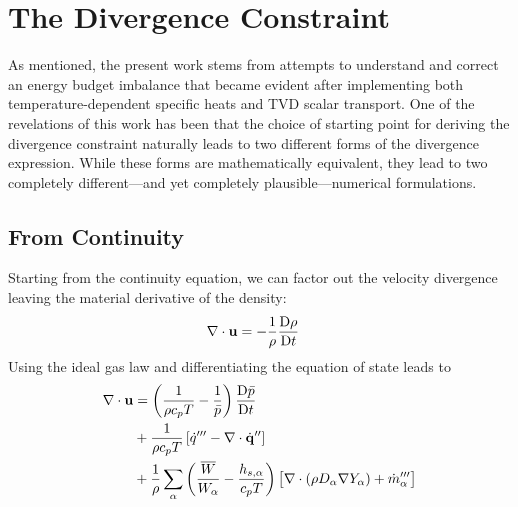 \section{The Divergence Constraint}
\label{div_constraint}

As mentioned, the present work stems from attempts to understand and correct an energy budget imbalance that became evident after implementing both temperature-dependent specific heats and TVD scalar transport. One of the revelations of this work has been that the choice of starting point for deriving the divergence constraint naturally leads to two different forms of the divergence expression.  While these forms are mathematically equivalent, they lead to two completely different---and yet completely plausible---numerical formulations.

\subsection{From Continuity}
Starting from the continuity equation, we can factor out the velocity divergence leaving the material derivative of the density:
\begin{align}
\nabla\cdot\mathbf{u} &= -\frac{1}{\rho}\frac{\mbox{D}\rho}{\mbox{D} t}
\end{align}
Using the ideal gas law and differentiating the equation of state leads to
\begin{align}
\label{eqn_div_1}
\nabla\cdot\mathbf{u} &= \left(\frac{1}{\rho c_p T} - \frac{1}{\bar{p}} \right)\frac{\mbox{D} \bar{p}}{\mbox{D} t} \notag\\
&+ \frac{1}{\rho c_p T} \left[ \dot{q}^{\prime\prime\prime} - \nabla\cdot \dot{\mathbf{q}}^{\prime\prime} \right] \notag\\
&+ \frac{1}{\rho} \sum_\alpha \left(\frac{\overline{W}}{W_\alpha} - \frac{h_{s,\alpha}}{c_p T} \right) \big[ \nabla\cdot (\rho D_\alpha \nabla Y_\alpha) + \dot{m}_\alpha^{\prime\prime\prime} \big]
\end{align}

